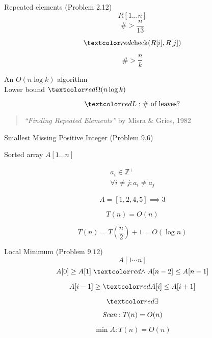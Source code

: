 
\begin{frame}{}
  \begin{exampleblock}{Repeated elements (Problem 2.12)}
    \[
      R[1 \dots n]
    \]
    \[
      \# > \frac{n}{13}
    \]

    \pause
    \[
      \red{\text{check}(R[i], R[j])}
    \]
  \end{exampleblock}
\end{frame}

\begin{frame}{}
  \[
    \# > \frac{n}{k}
  \]

  \pause
  \begin{center}
    An $O(n \log k)$ algorithm \\[15pt] \pause
    Lower bound $\red{\Omega(n \log k)}$
  \end{center}

  \pause
  \[
    \red{L: \# \text{ of leaves} ?}
  \]

  \pause
  \vspace{0.60cm}
  \begin{quote}
    \centering
    {\it ``Finding Repeated Elements''} by Misra \& Gries, 1982
  \end{quote}
\end{frame}

\begin{frame}{}
  \begin{exampleblock}{Smallest Missing Positive Integer (Problem $9.6$)}
    \centerline{Sorted array $A[1 \ldots n]$}

    \vspace{-0.50cm}
    \begin{gather*}
      a_i \in \mathbb{Z}^{+} \\
      \forall i \neq j: a_i \neq a_j
    \end{gather*}

    \pause
    \vspace{-0.30cm}
    \[
      A = [1,2,4,5] \implies 3
    \]
  \end{exampleblock}

  \pause
  \[
    T(n) = O(n)
  \]

  \pause
  \[
    T(n) = T(\frac{n}{2}) + 1 = O(\log n)
  \]
\end{frame}

\begin{frame}{}
  \begin{exampleblock}{Local Minimum (Problem $9.12$)}
    \[
      A[1 \cdots n]
    \]
    \[
      A[0] \ge A[1] \;\red{\land}\; A[n-2] \le A[n-1]
    \]

    \[
      A[i-1] \ge \red{A[i]} \le A[i+1]
    \]
  \end{exampleblock}

  \pause
  \[
    \red{\exists}
  \]

  \pause
  \[
    \text{\it Scan}: T(n) = O(n)
  \]

  \pause
  \[
    \min A: T(n) = O(n)
  \]
\end{frame}

